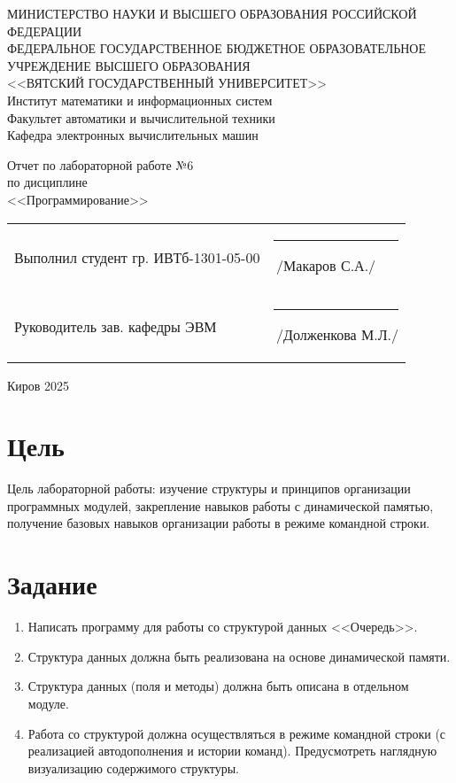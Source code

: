 \documentclass[a4paper,14pt]{extarticle}
\begin{document}
  \newpage\thispagestyle{empty}
  \begin{center}
    \MakeUppercase{
      Министерство науки и высшего образования Российской Федерации\\
      Федеральное государственное бюджетное образовательное учреждение высшего образования\\
      <<Вятский Государственный Университет>>\\
    }
    Институт математики и информационных систем\\
    Факультет автоматики и вычислительной техники\\
    Кафедра электронных вычислительных машин
  \end{center}
  \vfill

  \begin{center}
    Отчет по лабораторной работе №6\\
    по дисциплине\\
    <<Программирование>>\\
  \end{center}
  \vfill

  \noindent
  \begin{tabular}{ll}
    Выполнил студент гр. ИВТб-1301-05-00 \hspace{5mm} &
    \rule[-1mm]{25mm}{0.10mm}\,/Макаров С.А./\\
    
    Руководитель зав. кафедры ЭВМ & \rule[-1mm]{25mm}{0.10mm}\,/Долженкова М.Л./\\
  \end{tabular}

  \vfill
  \begin{center}
    Киров 2025
  \end{center}

  \newpage
  \section*{Цель}
  Цель лабораторной работы: изучение структуры и принципов организации программных модулей, закрепление навыков работы с динамической памятью, получение базовых навыков организации работы в режиме командной строки.

  \section*{Задание}
  \begin{enumerate}
    \item Написать программу для работы со структурой данных <<Очередь>>.
    \item Структура данных должна быть реализована на основе динамической памяти.
    \item Структура данных (поля и методы) должна быть описана в отдельном модуле.
    \item Работа со структурой должна осуществляться в режиме командной строки (с реализацией автодополнения и истории команд). Предусмотреть наглядную визуализацию содержимого структуры.
  \end{enumerate}
\end{document}
